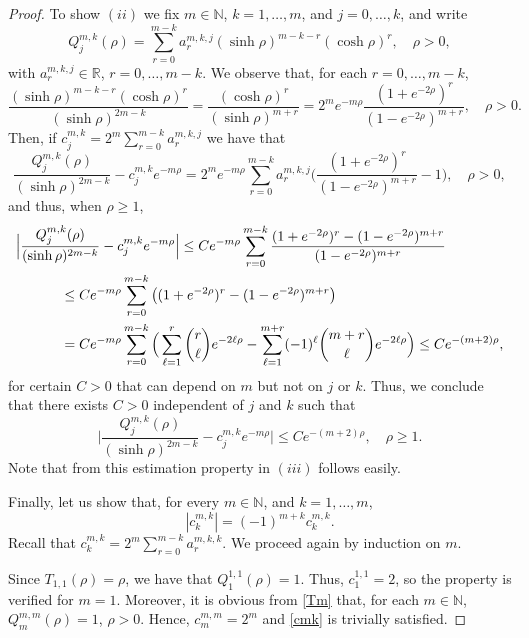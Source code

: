\documentclass[a4paper,10pt, reqno]{amsart}
\theoremstyle{definition}
\theoremstyle{remark}
\numberwithin{equation}{section}
\begin{document}
{\begin{proof}
To show $(ii)$ we fix $m\in \mathbb N$, $k=1,\ldots, m$, and $j=0,\ldots, k$, and  write
$$
Q_j^{m,k}(\rho )=\sum_{r=0}^{m-k}a_r^{m,k,j}(\sinh \rho )^{m-k-r}(\cosh \rho )^{r},\quad \rho >0,
$$
with $a_r^{m,k,j}\in \mathbb R$, $r=0,\ldots, m-k$. We observe that, for each $r=0,\ldots, m-k$,
$$
\frac{(\sinh \rho )^{m-k-r}(\cosh \rho )^r}{(\sinh \rho )^{2m-k}}=\frac{(\cosh \rho )^r}{(\sinh \rho )^{m+r}}=2^me^{-m\rho }\frac{(1+e^{-2\rho })^r}{(1-e^{-2\rho })^{m+r}},\quad \rho >0.
$$
Then, if $c_j^{m,k}=2^m\sum_{r=0}^{m-k}a_r^{m,k,j}$ we have that
$$
\frac{Q_j^{m,k}(\rho )}{(\sinh \rho )^{2m-k}}-c_j^{m,k}e^{-m\rho }=2^me^{-m\rho }\sum_{r=0}^{m-k}a_r^{m,k,j}\Big(\frac{(1+e^{-2\rho })^r}{(1-e^{-2\rho })^{m+r}}-1\Big),\quad \rho >0,
$$
and thus, when $\rho \geq 1$,
\begin{align*}
 \Big|\frac{Q_j^{m,k}(\rho )}{(\sinh \rho )^{2m-k}}-c_j^{m,k}e^{-m\rho }\Big|&\leq Ce^{-m\rho }\sum_{r=0}^{m-k}\frac{(1+e^{-2\rho })^r-(1-e^{-2\rho })^{m+r}}{(1-e^{-2\rho })^{m+r}}\\
 &\hspace{-3cm}\leq  Ce^{-m\rho }\sum_{r=0}^{m-k}\big((1+e^{-2\rho })^r-(1-e^{-2\rho })^{m+r}\big)\\
  &\hspace{-3cm}=Ce^{-m\rho }\sum_{r=0}^{m-k}\Big(\sum_{\ell =1}^r\binom{r}{\ell}e^{-2\ell\rho}-\sum_{\ell =1}^{m+r}(-1)^\ell \binom{m+r}{\ell}e^{-2\ell\rho }\Big)\leq Ce^{-(m+2)\rho },
\end{align*}
for certain $C>0$ that can depend on $m$ but not on $j$ or $k$. Thus,
we conclude that there exists $C>0$ independent of $j$ and $k$ such that
$$
 \Big|\frac{Q_j^{m,k}(\rho )}{(\sinh \rho )^{2m-k}}-c_j^{m,k}e^{-m\rho }\Big|\leq Ce^{-(m+2)\rho },\quad \rho \geq 1.
$$
Note that from this estimation property in $(iii)$ follows easily. 

Finally, let us show that, for every $m\in \mathbb N$, and $k=1,\ldots, m$,
\begin{equation}\label{cmk}
|c_k^{m,k}|=(-1)^{m+k}c_k^{m,k}.
\end{equation}
Recall that $c^{m,k}_k=2^m\sum_{r=0}^{m-k}a_r^{m,k,k}$. We proceed again by induction on $m$.  

Since $T_{1,1}(\rho )=\rho $, we have that $Q_1^{1,1}(\rho )=1$. Thus, $c_1^{1,1}=2$, so the property is verified for $m=1$. Moreover, it is obvious from \eqref{Tm} that, for each $m\in \mathbb N$, $Q^{m,m}_m(\rho )=1$, $\rho >0$. Hence, $c_m^{m,m}=2^m$ and \eqref{cmk} is trivially satisfied.


\end{proof}}
\end{document}
